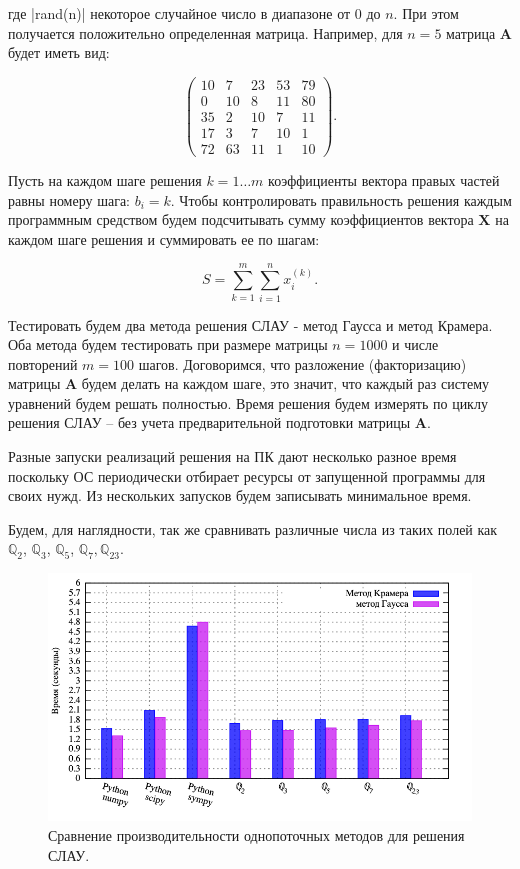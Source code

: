 \documentclass[master, och, diploma, times]{sty/SCWorks}
\theoremstyle{plain}
\theoremstyle{definition}
\numberwithin{equation}{section}
\begin{document}
\noindent где |rand(n)| некоторое случайное число в диапазоне от $0$ до $n$. При этом получается положительно определенная матрица. Например, для $n=5$ матрица $\boldsymbol{A}$ будет иметь вид:

$$
\begin{pmatrix}
  10 & 7 & 23 & 53 & 79 \\
  0 & 10 & 8 & 11 & 80 \\
  35 & 2 & 10 & 7 & 11 \\
  17 & 3 & 7 & 10 & 1 \\
  72 & 63 & 11 & 1 & 10
\end{pmatrix}.
$$

Пусть на каждом шаге решения $k=1 \dots m$ коэффициенты вектора правых частей равны номеру шага: $b_i = k$.
Чтобы контролировать правильность решения каждым программным средством будем подсчитывать сумму коэффициентов вектора $\boldsymbol{X}$ на каждом шаге решения и суммировать ее по шагам:

\begin{equation}
S = \sum\limits_{k=1}^{m}\sum\limits_{i=1}^{n} x_i^{(k)}.
\end{equation}

Тестировать будем два метода решения СЛАУ - метод Гаусса и метод Крамера. Оба метода будем тестировать при размере матрицы $n=1000$ и числе повторений $m=100$ шагов. Договоримся, что разложение (факторизацию) матрицы $\boldsymbol{A}$ будем делать на каждом шаге, это значит, что каждый раз систему уравнений будем решать полностью. Время решения будем измерять по циклу решения СЛАУ – без учета предварительной подготовки матрицы $\boldsymbol{A}$.

Разные запуски реализаций решения на ПК дают несколько разное время поскольку ОС периодически отбирает ресурсы от запущенной программы для своих нужд. Из нескольких запусков будем записывать минимальное время.

Будем, для наглядности, так же сравнивать различные числа из таких полей как $\mathbb{Q}_2$, $\mathbb{Q}_3$, $\mathbb{Q}_5$, $\mathbb{Q}_7, \mathbb{Q}_{23}$.
 
\begin{figure}[H]
\centerline{\includegraphics[width=0.85\linewidth]{../gnuplot/single/system/plot.png}}
\caption{Сравнение производительности однопоточных методов для решения СЛАУ.}
\label{img:single:system:1}
\end{figure}
 
\end{document}
